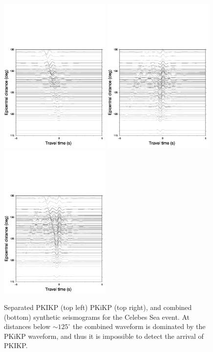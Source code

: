 \documentclass[11pt,a4paper]{article}
\begin{document}
\begin{figure}
	\centering
	\includegraphics[width=0.49\textwidth]{figures/celebessea_KIK_aligned}
	\includegraphics[width=0.49\textwidth]{figures/celebessea_pkikp_aligned}
	\includegraphics[width=0.49\textwidth]{figures/celebessea_both_aligned}
	\caption{Separated PKIKP (top left) PKiKP (top right), and combined (bottom) synthetic seismograms for the Celebes Sea event. At distances below  $\sim125^{\circ}$ the combined waveform is dominated by the PKiKP waveform, and thus it is impossible to detect the arrival of PKIKP.}
	\label{fig:Synth aligned}
\end{figure}
\end{document}
